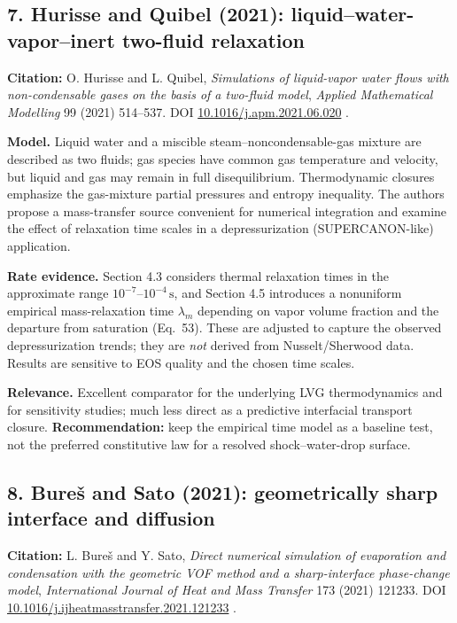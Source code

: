 \documentclass[11pt,letterpaper]{article}
\begin{document}
\subsection{7. Hurisse and Quibel (2021): liquid--water-vapor--inert two-fluid relaxation}
\textbf{Citation:} O. Hurisse and L. Quibel, \emph{Simulations of liquid-vapor water flows with non-condensable gases on the basis of a two-fluid model}, \emph{Applied Mathematical Modelling} 99 (2021) 514--537. DOI \href{https://doi.org/10.1016/j.apm.2021.06.020}{10.1016/j.apm.2021.06.020} \cite{HurisseQuibel2021}.

\textbf{Model.} Liquid water and a miscible steam--noncondensable-gas mixture are described as two fluids; gas species have common gas temperature and velocity, but liquid and gas may remain in full disequilibrium. Thermodynamic closures emphasize the gas-mixture partial pressures and entropy inequality. The authors propose a mass-transfer source convenient for numerical integration and examine the effect of relaxation time scales in a depressurization (SUPERCANON-like) application.

\textbf{Rate evidence.} Section 4.3 considers thermal relaxation times in the approximate range $10^{-7}$--$10^{-4}\,\mathrm{s}$, and Section 4.5 introduces a nonuniform empirical mass-relaxation time $\lambda_m$ depending on vapor volume fraction and the departure from saturation (Eq.~53). These are adjusted to capture the observed depressurization trends; they are \emph{not} derived from Nusselt/Sherwood data. Results are sensitive to EOS quality and the chosen time scales.

\textbf{Relevance.} Excellent comparator for the underlying LVG thermodynamics and for sensitivity studies; much less direct as a predictive interfacial transport closure. \textbf{Recommendation:} keep the empirical time model as a baseline test, not the preferred constitutive law for a resolved shock--water-drop surface.

\subsection{8. Bure\v{s} and Sato (2021): geometrically sharp interface and diffusion}
\textbf{Citation:} L. Bure\v{s} and Y. Sato, \emph{Direct numerical simulation of evaporation and condensation with the geometric VOF method and a sharp-interface phase-change model}, \emph{International Journal of Heat and Mass Transfer} 173 (2021) 121233. DOI \href{https://doi.org/10.1016/j.ijheatmasstransfer.2021.121233}{10.1016/j.ijheatmasstransfer.2021.121233} \cite{BuresSato2021}.
\end{document}
